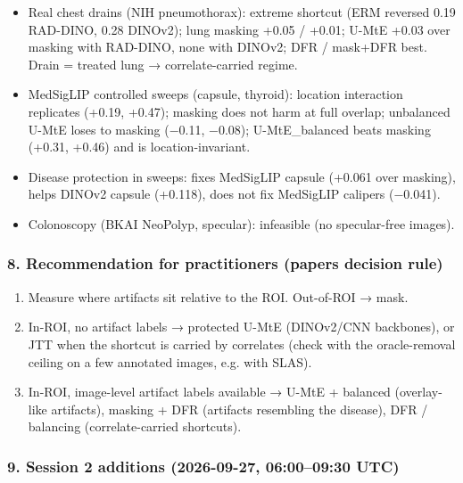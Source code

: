 {\begin{itemize}
\item
  Real chest drains (NIH pneumothorax): extreme shortcut (ERM reversed 0.19 RAD-DINO, 0.28 DINOv2); lung masking +0.05 / +0.01;
  U-MtE +0.03 over masking with RAD-DINO, none with DINOv2; DFR / mask+DFR best. Drain = treated lung → correlate-carried regime.
\item
  MedSigLIP controlled sweeps (capsule, thyroid): location interaction replicates (+0.19, +0.47); masking does not
  harm at full overlap; unbalanced U-MtE loses to masking (−0.11, −0.08); U-MtE\_balanced beats masking (+0.31,
  +0.46) and is location-invariant.
\item
  Disease protection in sweeps: fixes MedSigLIP capsule (+0.061 over masking), helps DINOv2 capsule (+0.118), does
  not fix MedSigLIP calipers (−0.041).
\item
  Colonoscopy (BKAI NeoPolyp, specular): infeasible (no specular-free images).
\end{itemize}

\subsubsection{8. Recommendation for practitioners (paper\textquotesingle s decision rule)}\label{8-recommendation-for-practitioners-papers-decision-rule}

\begin{enumerate}
\def\labelenumi{\arabic{enumi}.}

\item
  Measure where artifacts sit relative to the ROI. Out-of-ROI → mask.
\item
  In-ROI, no artifact labels → protected U-MtE (DINOv2/CNN backbones), or JTT when the shortcut is carried by
  correlates (check with the oracle-removal ceiling on a few annotated images, e.g. with SLAS).
\item
  In-ROI, image-level artifact labels available → U-MtE + balanced (overlay-like artifacts), masking + DFR
  (artifacts resembling the disease), DFR / balancing (correlate-carried shortcuts).
\end{enumerate}

\subsubsection{9. Session 2 additions (2026-09-27, 06:00--09:30 UTC)}\label{9-session-2-additions-2026-09-27-06000930-utc}

\begin{itemize}


\end{itemize}}
